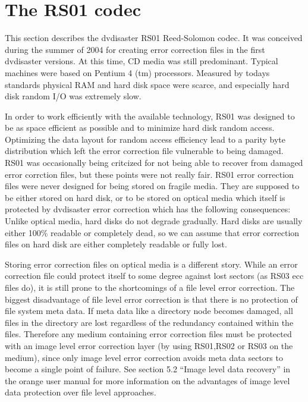 \newpage
\section{The RS01 codec}
\label{rs01}
This section describes the dvdisaster RS01 Reed-Solomon codec. 
It was conceived during the summer of 2004 for creating 
error correction files in the first dvdisaster versions.
At this time, CD media was still predominant. 
Typical machines were based on Pentium 4 (tm) processors.
Measured by todays standards physical RAM and hard disk
space were scarce, and especially hard disk random I/O
was extremely slow. 

\smallskip

In order to work efficiently with the available technology,
RS01 was designed to be as space efficient as possible 
and to minimize hard disk random access. 
Optimizing the data layout for random access efficiency
lead to a parity byte distribution which left the error correction
file vulnerable to being damaged. RS01 was 
occasionally being critcized for not being able to recover 
from damaged error corrction files, but these points
were not really fair. RS01 error correction
files were never designed for being stored on fragile
media. They are supposed to
be either stored on hard disk, or to be stored on optical
media which itself is protected by dvdisaster error
correction which has the following consequences:
 Unlike optical media, hard disks do not degrade
gradually. Hard disks are usually either 100\% readable or 
completely dead, so we can assume that error correction
files on hard disk are either completely readable or fully lost.

Storing error correction files on optical media is a different
story. While an error correction file could protect itself to some
degree against lost sectors (as RS03 ecc files do), it is still
prone to the shortcomings of a file level error correction. 
The biggest disadvantage of file level error correction is
that there is no protection of file system meta data.
If meta data like a directory node becomes damaged, all files
in the directory are lost regardless of the redundancy contained
within the files. Therefore any medium containing error 
correction files must be protected with an image level
error correction layer (by using RS01,RS02 or RS03 on the medium), 
since only image level error correction avoids meta 
data sectors to become a single point of failure. See section 5.2
``Image level data recovery'' in the orange user manual for
more information on the advantages of image level data protection
over file level approaches.

